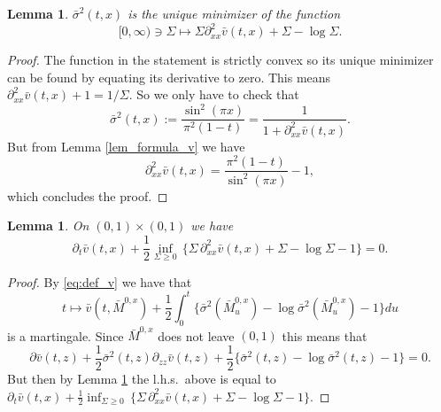 \documentclass[reqno, a4paper]{amsart}
\newtheorem{lemma}[theorem]{Lemma}
\theoremstyle{remark}
\newcommand{\1}{\mathbbm 1}
\numberwithin{equation}{section}
\numberwithin{theorem}{section}
\newcommand{\mo}{\bar{M}}
\newcommand{\vo}{\bar{v}}
\newcommand{\so}{\bar{\sigma}}
\begin{document}

\begin{lemma}\label{lem:second_var}
$\so^2(t,x)$ is the unique minimizer of the function
$$[0,\infty)\ni\Sigma \mapsto \Sigma \partial^2_{xx}\vo(t,x)+\Sigma -\log\Sigma .$$
\end{lemma}


\begin{proof} The function in the statement is strictly convex so its unique minimizer can be found by equating its derivative to zero. This means $\partial^2_{xx}\vo(t,x)+1 = 1/ \Sigma$. So we only have to check that 
$$\so^2(t,x):= \frac{\sin^2(\pi x)}{\pi^2(1-t)}= \frac{1}{1+\partial^2_{xx}\vo(t,x)}.$$
But from Lemma \ref{lem_formula_v} we have
$$\partial^2_{xx}\vo(t,x) = \frac{\pi^2(1-t)}{\sin^2(\pi x)} -1,$$
which concludes the proof.
\end{proof}

\begin{lemma}\label{lem_HJB}
	On $(0,1)\times(0,1)$ we have
	\[\partial_t \vo(t,x) +\frac{1}{2}\inf_{\Sigma\geq 0}\, \{\Sigma\, \partial^2_{xx}\vo(t,x)+\Sigma -\log\Sigma-1\}=0. \]
\end{lemma}

\begin{proof}
	By \eqref{eq:def_v} we have that
	\[t\mapsto \vo(t,\mo^{0,x})+\frac{1}{2}\int_0^t\{ \so^2(\mo^{0,x}_u) - \log\so^2(\mo^{0,x}_u) -1\}du \]
	is a martingale. Since $\mo^{0,x}$ does not leave $(0,1)$ this means that
	\[\partial \vo(t,z) +\frac{1}{2}\so^2(t,z)\partial_{zz}\vo(t,z) + \frac{1}{2}\{\so^2(t,z)-\log\so^2(t,z)-1\}=0.\]
	But then by  Lemma \ref{lem:second_var} the l.h.s.\ above is equal to $\partial_t \vo(t,x) +\frac{1}{2}\inf_{\Sigma\geq 0}\, \{\Sigma\, \partial^2_{xx}\vo(t,x)+\Sigma -\log\Sigma-1\}$.
\end{proof}
\end{document}
